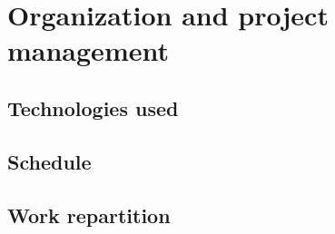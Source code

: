 \chapter{Organization and project management}
\section{Technologies used}
\section{Schedule}
\section{Work repartition}